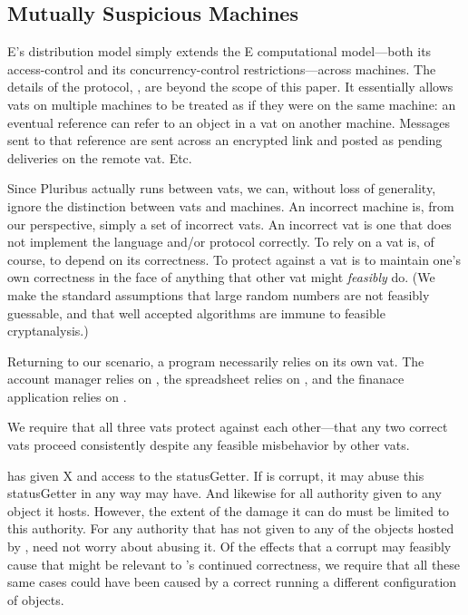 \documentclass{llncs}
\begin{document}

\subsection{Mutually Suspicious Machines}

E's distribution model simply extends the E computational model---both
its access-control and its concurrency-control restrictions---across
machines.  The details of the protocol, , are beyond the
scope of this paper.  It essentially allows vats on multiple machines
to be treated as if they were on the same machine: an eventual
reference can refer to an object in a vat on another machine.
Messages sent to that reference are sent across an encrypted link and
posted as pending deliveries on the remote vat.  Etc.

Since Pluribus actually runs between vats, we can, without loss of
generality, ignore the distinction between vats and machines. An
incorrect machine is, from our perspective, simply a set of incorrect
vats. An incorrect vat is one that does not implement the language
and/or protocol correctly. To rely on a vat is, of course, to depend
on its correctness. To protect against a vat is to maintain one's own
correctness in the face of anything that other vat might
\emph{feasibly} do. (We make the standard assumptions that large
random numbers are not feasibly guessable, and that well accepted
algorithms are immune to feasible cryptanalysis.)

Returning to our scenario, a program necessarily relies on its own
vat. The account manager relies on , the spreadsheet
relies on , and the finanace application relies on .

We require that all three vats protect against each other---that any two
correct vats proceed consistently despite any feasible misbehavior by
other vats.

  has given X and  access to the
statusGetter. If  is corrupt, it may abuse this statusGetter in
any way  may have. And likewise for all authority given to any
object it hosts. However, the extent of the damage it can do must be
limited to this authority. For any authority that  has not
given to any of the objects hosted by ,  need not
worry about  abusing it. Of the effects that a corrupt 
may feasibly cause that might be relevant to 's continued
correctness, we require that all these same cases could have been
caused by a correct  running a different configuration of
objects.
\end{document}
